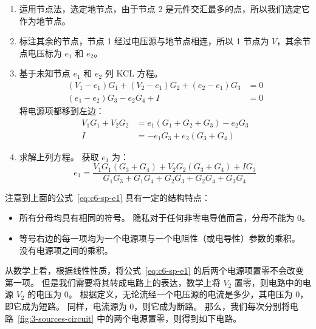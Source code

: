 \begin{enumerate}
  \item 运用节点法，选定地节点，由于节点 2 是元件交汇最多的点，所以我们选定它作为地节点。
  \item 标注其余的节点，节点 1 经过电压源与地节点相连，所以 1 节点为 $V$，其余节点电压标为 $e_1$ 和 $e_2$。
  \item 基于未知节点 $e_1$ 和 $e_2$ 列 KCL 方程。
    \begin{subequations}
      \begin{align}
        (V_1 - e_1)G_1 + (V_2 - e_1)G_2 + (e_2 - e_1)G_3 &= 0 \\
        (e_1 - e_2)G_3 - e_2G_4 + I &= 0
      \end{align}
    \end{subequations}
    将电源项都移到左边：
    \begin{subequations}
      \begin{align}
        V_1G_1 + V_2G_2 &= e_1(G_1 + G_2 + G_3) - e_2G_3 \\
        I &= -e_1G_3 + e_2(G_3 + G_4)
      \end{align}
    \end{subequations}
  \item 求解上列方程。
    获取 $e_1$ 为：
    \begin{equation}
      e_1 = \frac{V_1G_1(G_3 + G_4) + V_2G_2(G_3 + G_4) + IG_3}{G_1G_3 + G_1G_4 + G_2G_3 + G_2G_4 + G_3G_4} \label{eq:c6-sp-e1}
    \end{equation}
\end{enumerate}

注意到上面的公式~\ref{eq:c6-sp-e1} 具有一定的结构特点：
\begin{itemize}
  \item 所有分母均具有相同的符号。
    隐私对于任何非零电导值而言，分母不能为 0。
  \item 等号右边的每一项均为一个电源项与一个电阻性（或电导性）参数的乘积。
    没有电源项之间的乘积。
\end{itemize}

从数学上看，根据线性性质，将公式~\ref{eq:c6-sp-e1} 的后两个电源项置零不会改变第一项。
但是我们需要将其转成电路上的表达，数学上将 $V_2$ 置零，则电路中的电源 $V_2$ 的电压为 0。
根据定义，无论流经一个电压源的电流是多少，其电压为 0，即它成为短路。
同样，电流源为 0，则它成为断路。
那么，我们每次分别将电路~\ref{fig:3-sources-circuit} 中的两个电源置零，则得到如下电路。

